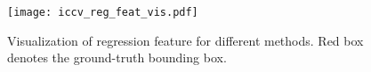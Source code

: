\documentclass[10pt,twocolumn,letterpaper]{article}
\begin{document}
\begin{figure}[tp]
\centering
\texttt{[image: iccv\_reg\_feat\_vis.pdf]}
\caption{Visualization of regression feature for different methods. Red box denotes the ground-truth bounding box.
}
\label{fig:reg_feat_vis}
\vspace{-0.2cm}
\end{figure}

\begin{table}[tp]
\begin{center}
\fontsize{8}{9}\selectfont  
{}
\end{center}
\vspace{-0.1cm}
\caption{Analysis of target aware transformer.} 
\label{tab:ab1}
\vspace{-0.4cm}
\end{table}
\end{document}
